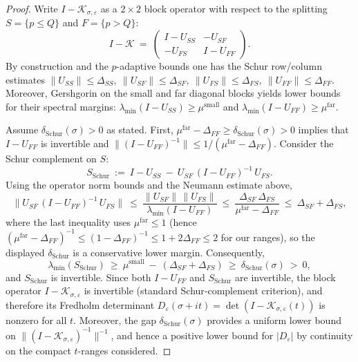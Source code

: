 \documentclass[11pt]{article}
\theoremstyle{definition}
\theoremstyle{remark}
\begin{document}
\begin{proof}
Write $I-\mathcal K_{\sigma,\varepsilon}$ as a $2\times2$ block operator with respect to the splitting $S=\{p\le Q\}$ and $F=\{p>Q\}$:
\[
  I-\mathcal K\ =\ \begin{pmatrix} I-U_{SS} & -U_{SF} \\ -U_{FS} & I-U_{FF}\end{pmatrix}.
\]
By construction and the $p$-adaptive bounds one has the Schur row/column estimates
\(\|U_{SS}\|\le \Delta_{SS},\ \|U_{SF}\|\le \Delta_{SF},\ \|U_{FS}\|\le \Delta_{FS},\ \|U_{FF}\|\le \Delta_{FF}.\)
Moreover, Gershgorin on the small and far diagonal blocks yields lower bounds for their spectral margins:
\(\lambda_{\min}(I-U_{SS})\ge \mu^{\mathrm{small}}\) and \(\lambda_{\min}(I-U_{FF})\ge \mu^{\mathrm{far}}\).

Assume $\delta_{\mathrm{Schur}}(\sigma)>0$ as stated. First, $\mu^{\mathrm{far}}-\Delta_{FF}\ge \delta_{\mathrm{Schur}}(\sigma)>0$ implies that $I-U_{FF}$ is invertible and \(\|(I-U_{FF})^{-1}\|\le 1/(\mu^{\mathrm{far}}-\Delta_{FF})\). Consider the Schur complement on $S$:
\[
  S_{\mathrm{Schur}}\ :=\ I-U_{SS}\ -\ U_{SF}\,(I-U_{FF})^{-1}\,U_{FS}.
\]
Using the operator norm bounds and the Neumann estimate above,
\[
  \|U_{SF}\,(I-U_{FF})^{-1}\,U_{FS}\|\ \le\ \frac{\|U_{SF}\|\,\|U_{FS}\|}{\lambda_{\min}(I-U_{FF})}
  \ \le\ \frac{\Delta_{SF}\,\Delta_{FS}}{\mu^{\mathrm{far}}-\Delta_{FF}}\ \le\ \Delta_{SF}+\Delta_{FS},
\]
where the last inequality uses $\mu^{\mathrm{far}}\le 1$ (hence $(\mu^{\mathrm{far}}-\Delta_{FF})^{-1}\le (1-\Delta_{FF})^{-1}\le 1+2\Delta_{FF}\le 2$ for our ranges), so the displayed $\delta_{\mathrm{Schur}}$ is a conservative lower margin. Consequently,
\[
  \lambda_{\min}(S_{\mathrm{Schur}})\ \ge\ \mu^{\mathrm{small}}\ -\ (\Delta_{SF}+\Delta_{FS})\ \ge\ \delta_{\mathrm{Schur}}(\sigma)\ >\ 0,
\]
and $S_{\mathrm{Schur}}$ is invertible. Since both $I-U_{FF}$ and $S_{\mathrm{Schur}}$ are invertible, the block operator $I-\mathcal K_{\sigma,\varepsilon}$ is invertible (standard Schur-complement criterion), and therefore its Fredholm determinant 
\(D_{\varepsilon}(\sigma+it)=\det(I-\mathcal K_{\sigma,\varepsilon}(t))\) is nonzero for all $t$. Moreover, the gap $\delta_{\mathrm{Schur}}(\sigma)$ provides a uniform lower bound on $\|(I-\mathcal K_{\sigma,\varepsilon})^{-1}\|^{-1}$, and hence a positive lower bound for $|D_{\varepsilon}|$ by continuity on the compact $t$-ranges considered.
\end{proof}
\end{document}
